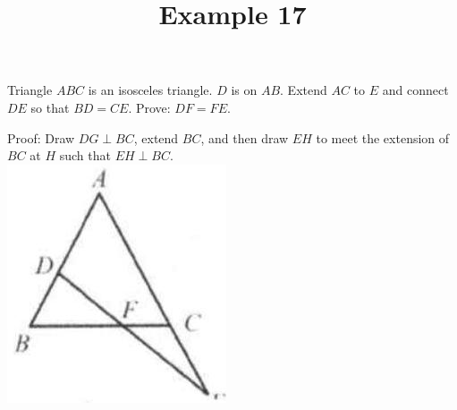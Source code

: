 \documentclass{article}
\title{Example 17}
\date{}
\begin{document}
\maketitle

Triangle \(A B C\) is an isosceles triangle. \(D\) is on \(A B\). Extend \(A C\) to \(E\) and connect \(D E\) so that \(B D=C E\). Prove: \(D F=F E\).

Proof:
Draw \(D G \perp B C\), extend \(B C\), and then draw \(E H\) to meet the extension of \(B C\) at \(H\) such that \(E H \perp B C\).\\
\centering
\includegraphics[width=\textwidth]{images/problem_image_1.jpg}
\end{document}
